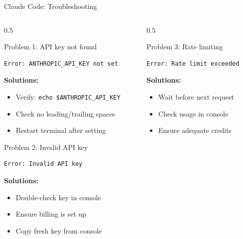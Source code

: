 \documentclass[aspectratio=169,11pt]{beamer}
\begin{document}
\begin{frame}[fragile]{Claude Code: Troubleshooting}
    \begin{columns}[T]
        \begin{column}{0.5\textwidth}
            \begin{alertblock}{Problem 1: API key not found}
                \begin{lstlisting}[style=bash,numbers=none]
Error: ANTHROPIC_API_KEY not set
                \end{lstlisting}
                \textbf{Solutions:}
                \begin{itemize}
                    \item Verify: \texttt{echo \$ANTHROPIC\_API\_KEY}
                    \item Check no leading/trailing spaces
                    \item Restart terminal after setting
                \end{itemize}
            \end{alertblock}

            \begin{alertblock}{Problem 2: Invalid API key}
                \begin{lstlisting}[style=bash,numbers=none]
Error: Invalid API key
                \end{lstlisting}
                \textbf{Solutions:}
                \begin{itemize}
                    \item Double-check key in console
                    \item Ensure billing is set up
                    \item Copy fresh key from console
                \end{itemize}
            \end{alertblock}
        \end{column}
        \begin{column}{0.5\textwidth}
            \begin{alertblock}{Problem 3: Rate limiting}
                \begin{lstlisting}[style=bash,numbers=none]
Error: Rate limit exceeded
                \end{lstlisting}
                \textbf{Solutions:}
                \begin{itemize}
                    \item Wait before next request
                    \item Check usage in console
                    \item Ensure adequate credits
                \end{itemize}
            \end{alertblock}


\end{column}
\end{columns}
\end{frame}
\end{document}
